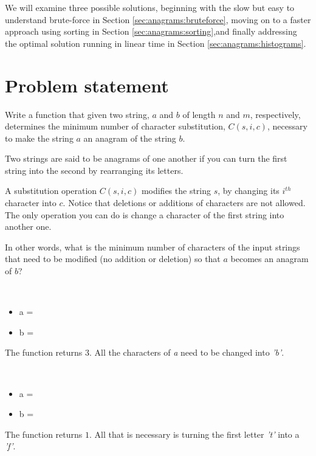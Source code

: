 We will examine three possible
solutions, beginning with the slow but easy to understand brute-force in Section \ref{sec:anagrams:bruteforce}, moving on to a faster approach using sorting in Section \ref{sec:anagrams:sorting},and finally addressing the optimal solution running in linear time in Section
\ref{sec:anagrams:histograms}. 

\section{Problem statement}
	\begin{exercise}
		Write a function that given two string, $a$ and $b$ of length $n$ and $m$, respectively, determines the minimum number of character substitution, $C(s, i, c)$, necessary to make the string $a$ an anagram of the string $b$.

		Two strings are said to be anagrams of one another if you can turn the first string into the second by rearranging its letters. 

		A substitution operation $C(s,i,c)$ modifies the string $s$, by changing its $i^{th}$ character into $c$. Notice that deletions or additions of characters are not allowed.
		The only operation you can do is change a character of the first string into another one. 

		In other words, what is the minimum number of characters of the input strings that need to be modified (no addition or deletion)  so that $a$ becomes an anagram of $b$?
		
	\begin{example}
		\label{ex:two_string_anagram:example1}
		\hfill \\
		\begin{itemize}
			\item 	a = 
			\item 	b = 
		\end{itemize}
		The function returns $3$. 
		All the characters of \textit{a} need to be changed into \textit{'b'}.
		\label{ex:anagrams:example1}
	\end{example}

	\begin{example}
		\hfill \\
		\begin{itemize}
			\item 	a = \quotes{tear}
			\item	b = \quotes{fear}
		\end{itemize}
		The function returns $1$. 
		All that is necessary is turning the first letter \textit{'t'} into a \textit{'f'}.
	\end{example}


\end{exercise}
